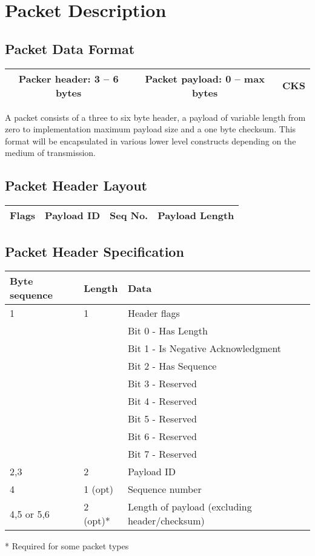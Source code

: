 \documentclass[12pt,a4paper,titlepage]{article}
\begin{document}
\section{Packet Description}

\subsection{Packet Data Format}
\begin{center}
\begin{tabular}{|c|c|c|}
\hline Packer header: 3 -- 6 bytes & Packet payload: 0 -- max bytes & CKS \\ 
\hline 
\end{tabular} 
\end{center}

A packet consists of a three to six byte header, a payload of variable length
from zero to implementation maximum payload size and a one byte checksum. This
format will be encapsulated in various lower level constructs depending on the
medium of transmission.

\subsection{Packet Header Layout}
\begin{center}
\begin{tabular}{|c|c|c|c|}
\hline  Flags & Payload ID & Seq No. & Payload Length \\
\hline 
\end{tabular} 
\end{center}

\subsection{Packet Header Specification}

\begin{center}
\begin{tabular}{|l|l|l|}
\hline Byte sequence & Length & Data \\ 
\hline 1 & 1 & Header flags \\
\multirow{8}{*}{} & \multirow{8}{*}{} & Bit 0 - Has Length \\
&& Bit 1 - Is Negative Acknowledgment \\
&& Bit 2 - Has Sequence \\
&& Bit 3 - Reserved \\
&& Bit 4 - Reserved \\
&& Bit 5 - Reserved \\
&& Bit 6 - Reserved \\
&& Bit 7 - Reserved \\
\hline 2,3 & 2 & Payload ID \\ 
\hline 4 & 1 (opt) & Sequence number \\ 
\hline 4,5 or 5,6 & 2 (opt)* & Length of payload (excluding header/checksum) \\ 
\hline 
\end{tabular} 
\end{center}
  * Required for some packet types
  
\end{document}
